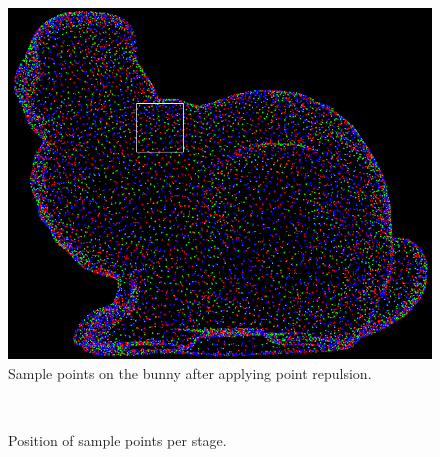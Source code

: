 \documentclass{article}
\begin{document}
\begin{figure}[h]
\centering
\includegraphics[scale=0.35]{./Pictures/pointrep_total.png}
\caption{Sample points on the bunny after applying point repulsion.}
\label{fig:turk_pointrepulsion_total}
\end{figure}

\begin{figure}[htbp]
  \begin{center}
    \mbox{
       \quad \label{fig:turk_pointrepulsion_before}
 \quad
\label{fig:turk_pointrepulsion_during}
\label{fig:turk_pointrepulsion_after}
      }
    \caption{Position of sample points per stage.}
    \label{fig:turk_before_during_after}
  \end{center}
\end{figure}
\end{document}
